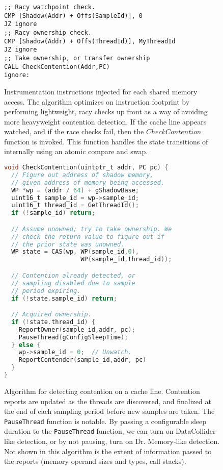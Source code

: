 \documentclass[letterpaper,twocolumn,10pt]{article}
\begin{document}
\begin{figure}
\lstset{language=[x64]Assembler}
\begin{lstlisting}[basicstyle=\footnotesize\ttfamily]
;; Racy watchpoint check.
CMP [Shadow(Addr) + Offs(SampleId)], 0
JZ ignore
;; Racy ownership check.
CMP [Shadow(Addr) + Offs(ThreadId)], MyThreadId
JZ ignore
;; Take ownership, or transfer ownership
CALL CheckContention(Addr,PC)
ignore:
\end{lstlisting}
\caption{\label{fig:inline_assembly}Instrumentation instructions injected for each shared memory access. The algorithm %
optimizes on instruction footprint by performing lightweight, racy checks up front as a way of avoiding more heavyweight %
contention detection. If the cache line appears watched, and if the race checks fail, then the $CheckContention$ function %
is invoked. This function handles the state transitions of  internally using an atomic compare and %
swap.}
\end{figure}

\begin{figure}
\begin{lstlisting}[language=C,basicstyle=\footnotesize\ttfamily]
void CheckContention(uintptr_t addr, PC pc) {
  // Figure out address of shadow memory,
  // given address of memory being accessed.
  WP *wp = (addr / 64) + gShadowBase;
  uint16_t sample_id = wp->sample_id;
  uint16_t thread_id = GetThreadId();
  if (!sample_id) return;

  // Assume unowned; try to take ownership. We
  // check the return value to figure out if
  // the prior state was unowned.
  WP state = CAS(wp, WP(sample_id,0),
                     WP(sample_id,thread_id));

  // Contention already detected, or
  // sampling disabled due to sample
  // period expiring.
  if (!state.sample_id) return;

  // Acquired ownership.
  if (!state.thread_id) {
    ReportOwner(sample_id,addr, pc);
    PauseThread(gConfigSleepTime);
  } else {
    wp->sample_id = 0;  // Unwatch.
    ReportContender(sample_id,addr, pc)
  }
}
\end{lstlisting}
\caption{\label{fig:algorithm}Algorithm for detecting contention on a cache line. Contention reports are updated as the threads %
are discovered, and finalized at the end of each sampling period before new samples are taken. The \texttt{PauseThread} function %
is notable. By passing a configurable sleep duration to the \texttt{PauseThread} function, we can turn on DataCollider-like detection, %
or by not pausing, turn on Dr. Memory-like detection. Not shown in this algorithm is the extent of information passed to the reports %
(memory operand sizes and types, call stacks).}
\end{figure}
\end{document}
